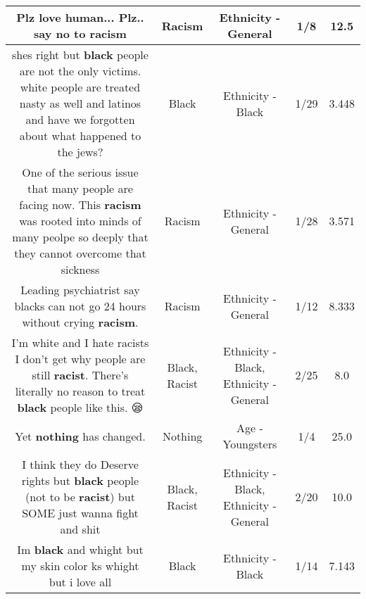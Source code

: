 \documentclass[11pt]{article}
\newlength\mylength
\begin{document}
\begin{center}
\begin{longtable}{|C{.65\mylength}|C{.30\mylength}|C{.12\mylength}|C{.12\mylength}|C{.12\mylength}|}
  \small Plz love human... Plz.. say no to racism\normalsize   & Racism & Ethnicity - General & 1/8 & 12.5 \\  \hline
  \small shes right but \textbf{black} people are not the only victims. white people are treated nasty as well and latinos and have we forgotten about what happened to the jews?\normalsize   & Black & Ethnicity - Black & 1/29 & 3.448 \\  \hline
  \small One of the serious issue that many people are facing now. This \textbf{racism} was rooted into minds of many peolpe so deeply that they cannot overcome that sickness\normalsize   & Racism & Ethnicity - General & 1/28 & 3.571 \\  \hline
  \small Leading psychiatrist say blacks can not go 24 hours without crying \textbf{racism}.\normalsize   & Racism & Ethnicity - General & 1/12 & 8.333 \\  \hline
  \small I'm white and I hate racists I don't get why people are still \textbf{racist}. There's literally no reason to treat \textbf{black} people like this. 😪\normalsize   & Black, Racist & Ethnicity - Black, Ethnicity - General & 2/25 & 8.0 \\  \hline
  \small Yet \textbf{nothing} has changed.\normalsize   & Nothing & Age - Youngsters & 1/4 & 25.0 \\  \hline
  \small I think they do Deserve rights but \textbf{black} people (not to be \textbf{racist}) but SOME just wanna fight and shit\normalsize   & Black, Racist & Ethnicity - Black, Ethnicity - General & 2/20 & 10.0 \\  \hline
  \small Im \textbf{black} and whight but my skin color ks whight but i love all\normalsize   & Black & Ethnicity - Black & 1/14 & 7.143 \\  \hline

\end{longtable}
\end{center}
\end{document}
